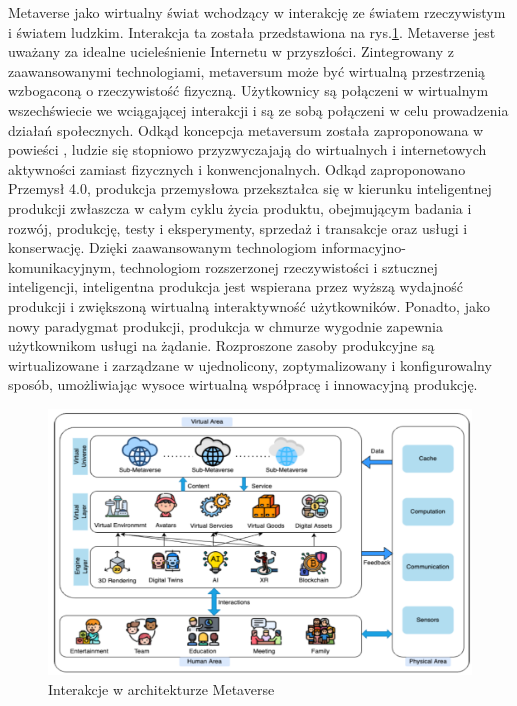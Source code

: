 Metaverse jako wirtualny świat  wchodzący w interakcję ze światem rzeczywistym i światem ludzkim. Interakcja ta została przedstawiona na rys.\ref{abstractMetaverseArchitectureHumanVirtualPhisical}. Metaverse jest uważany za idealne ucieleśnienie Internetu w przyszłości. Zintegrowany z zaawansowanymi technologiami, metaversum może być wirtualną przestrzenią wzbogaconą o rzeczywistość fizyczną. Użytkownicy są połączeni w wirtualnym wszechświecie we wciągającej interakcji i są ze sobą połączeni w celu prowadzenia działań społecznych. Odkąd koncepcja metaversum została zaproponowana w powieści , ludzie się stopniowo przyzwyczajają do wirtualnych i internetowych aktywności zamiast fizycznych i konwencjonalnych. Odkąd zaproponowano Przemysł 4.0, produkcja przemysłowa przekształca się w kierunku inteligentnej produkcji zwłaszcza w całym cyklu życia produktu, obejmującym badania i rozwój, produkcję, testy i eksperymenty, sprzedaż i transakcje oraz usługi i konserwację. Dzięki zaawansowanym technologiom informacyjno-komunikacyjnym, technologiom rozszerzonej rzeczywistości i sztucznej inteligencji, inteligentna produkcja jest wspierana przez wyższą wydajność produkcji i zwiększoną wirtualną interaktywność użytkowników. Ponadto, jako nowy paradygmat produkcji, produkcja w chmurze wygodnie zapewnia użytkownikom usługi na żądanie. Rozproszone zasoby produkcyjne są wirtualizowane i zarządzane w ujednolicony, zoptymalizowany i konfigurowalny sposób, umożliwiając wysoce wirtualną współpracę i innowacyjną produkcję\cite{industrialMetaverseForSmartManufacturing}. 

\begin{figure}[htbp!]
    \centering
    \includegraphics[width=\textwidth]{images/metaverse/metaverseAbstractArchitecture.png}
    \caption{Interakcje w architekturze Metaverse\cite{aSurveyofMobileEdgeComputingForMetaverse}}
    \label{abstractMetaverseArchitectureHumanVirtualPhisical}
\end{figure}

